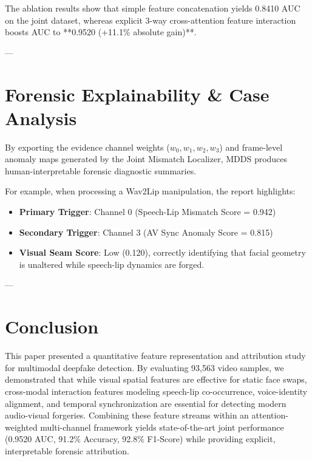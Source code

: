 \documentclass[conference]{IEEEtran}
\begin{document}
The ablation results show that simple feature concatenation yields 0.8410 AUC on the joint dataset, whereas explicit 3-way cross-attention feature interaction boosts AUC to **0.9520 (+11.1\% absolute gain)**.

---

\section{Forensic Explainability & Case Analysis}
By exporting the evidence channel weights ($w_0, w_1, w_2, w_3$) and frame-level anomaly maps generated by the Joint Mismatch Localizer, MDDS produces human-interpretable forensic diagnostic summaries.

For example, when processing a Wav2Lip manipulation, the report highlights:
\begin{itemize}
    \item \textbf{Primary Trigger}: Channel 0 (Speech-Lip Mismatch Score = 0.942)
    \item \textbf{Secondary Trigger}: Channel 3 (AV Sync Anomaly Score = 0.815)
    \item \textbf{Visual Seam Score}: Low (0.120), correctly identifying that facial geometry is unaltered while speech-lip dynamics are forged.
\end{itemize}

---

\section{Conclusion}
This paper presented a quantitative feature representation and attribution study for multimodal deepfake detection. By evaluating 93,563 video samples, we demonstrated that while visual spatial features are effective for static face swaps, cross-modal interaction features modeling speech-lip co-occurrence, voice-identity alignment, and temporal synchronization are essential for detecting modern audio-visual forgeries. Combining these feature streams within an attention-weighted multi-channel framework yields state-of-the-art joint performance (0.9520 AUC, 91.2\% Accuracy, 92.8\% F1-Score) while providing explicit, interpretable forensic attribution.



\end{document}

